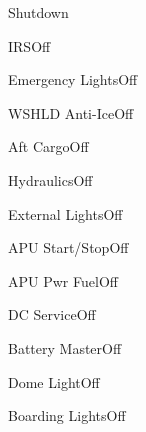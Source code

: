 \documentclass[sim-use, halfpage]{checklist}
\begin{document}
\begin{checklist}{Shutdown} 
    \item{IRS}{Off}
    \item{Emergency Lights}{Off}
    \item{WSHLD Anti-Ice}{Off}
    \item{Aft Cargo}{Off}
    \item{Hydraulics}{Off}
    \item{External Lights}{Off}
    \item{APU Start/Stop}{Off}
    \item{APU Pwr Fuel}{Off}
    \item{DC Service}{Off}
    \item{Battery Master}{Off}
    \item{Dome Light}{Off}
    \item{Boarding Lights}{Off}
\end{checklist}
\end{document}
